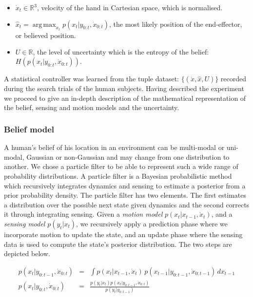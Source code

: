 \begin{itemize}
 \item $\dot{x}_t \in \mathbb{R}^{3}$, velocity of the hand in Cartesian
space, which is normalised. 
 \item $\hat{x}_t = \operatorname*{arg\,max}_{x_t} p(x_{t}|y_{0:t},\dot{x}_{0:t})$, the most likely position of the
end-effector, or believed position.
 \item $U \in \mathbb{R}$, the level of uncertainty which is the entropy of the belief: $H\left(p(x_{t}|y_{0:t},\dot{x}_{0:t})\right)$.
\end{itemize}
A statistical controller was learned from the tuple dataset: $\{(\dot{x},\hat{x},U)\}$ recorded during the search 
trials of the human subjects. Having described the experiment we proceed to give an in-depth description 
of the mathematical representation of the belief, sensing and motion models and the uncertainty. 


\subsubsection{Belief model}


A human's belief of his location in an environment can be multi-modal or uni-modal, Gaussian or non-Gaussian and may change from one distribution to another. 
We chose a particle filter to be able to represent such a wide range of probability distributions. A particle filter is a Bayesian probabilistic method 
which recursively integrates dynamics and sensing to estimate a posterior from a prior probability density. The particle filter has two elements. The first 
estimates a distribution over the possible next state given dynamics and the second corrects it through integrating sensing. Given 
a \textit{motion model} $p(x_{t}|x_{t-1},\dot{x}_{t})$, and a \textit{sensing model} $p(y_{t}|x_{t})$, we recursively apply a 
prediction phase where we incorporate motion to update the state, and an update phase where the sensing data is used to 
compute the state's posterior distribution. The two steps are depicted below.

\begin{eqnarray}
 p(x_{t}|y_{0:t-1},\dot{x}_{0:t}) &=& \int p(x_{t}|x_{t-1},\dot{x}_{t})\,p(x_{t-1}|y_{0:t-1},\dot{x}_{0:t-1})\,dx_{t-1} \\
 p(x_{t}|y_{0:t},\dot{x}_{0:t}) &=& \frac{p(y_{t}|x_{t})p(x_{t}|y_{0:t-1},\dot{x}_{0:t})}{p(y_{t}|y_{0:t-1})}
\end{eqnarray}

